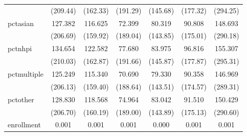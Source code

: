 {\begin{tabular}{l*{6}{c}}
            &                 (209.44)         &                 (162.33)         &                 (191.29)         &                 (145.68)         &                 (177.32)         &                 (294.25)         \\
pctasian    &                  127.382         &                  116.625         &                   72.399         &                   80.319         &                   90.808         &                  148.693         \\
            &                 (206.69)         &                 (159.92)         &                 (189.04)         &                 (143.85)         &                 (175.01)         &                 (290.18)         \\
pctnhpi     &                  134.654         &                  122.582         &                   77.680         &                   83.975         &                   96.816         &                  155.307         \\
            &                 (210.03)         &                 (162.87)         &                 (191.66)         &                 (145.87)         &                 (177.87)         &                 (295.31)         \\
pctmultiple &                  125.249         &                  115.340         &                   70.690         &                   79.330         &                   90.358         &                  146.969         \\
            &                 (206.13)         &                 (159.40)         &                 (188.64)         &                 (143.51)         &                 (174.57)         &                 (289.31)         \\
pctother    &                  128.830         &                  118.568         &                   74.964         &                   83.042         &                   91.510         &                  150.429         \\
            &                 (206.70)         &                 (160.19)         &                 (189.00)         &                 (143.89)         &                 (175.13)         &                 (290.60)         \\
enrollment  &                    0.001         &                    0.001         &                    0.001         &                    0.000         &                    0.001         &                    0.001         \\

\end{tabular}}

